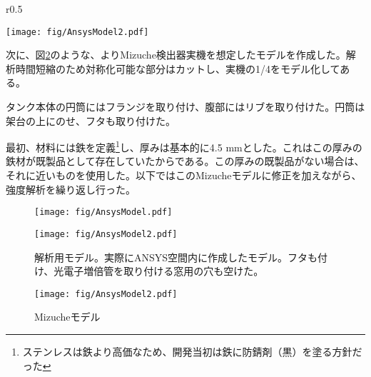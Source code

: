 \documentclass[11pt]{jreport}
\newcommand{\figref}[1]{図\ref{#1}}
\begin{document}
\begin{wrapfigure}{r}{0.5\textwidth}
\begin{center}
\texttt{[image: fig/AnsysModel2.pdf]}
\caption[``Mizuche''モデル]{``Mizuche''モデル。}
\label{AnsysModel3}
\end{center}
\end{wrapfigure}
\fi

次に、\figref{AnsysModel3}のような、よりMizuche検出器実機を想定したモデルを作成した。解析時間短縮のため対称化可能な部分はカットし、実機の1/4をモデル化してある。

タンク本体の円筒にはフランジを取り付け、腹部にはリブを取り付けた。円筒は架台の上にのせ、フタも取り付けた。

最初、材料には鉄を定義\footnote{ステンレスは鉄より高価なため、開発当初は鉄に防錆剤（黒）を塗る方針だった}し、厚みは基本的に4.5 mmとした。これはこの厚みの鉄材が既製品として存在していたからである。この厚みの既製品がない場合は、それに近いものを使用した。以下ではこのMizucheモデルに修正を加えながら、強度解析を繰り返し行った。

\begin{figure}[htbp]
\begin{minipage}{0.47\textwidth}
\begin{center}
\texttt{[image: fig/AnsysModel.pdf]}
\caption[強度解析モデルのスケッチ]{強度解析モデルのスケッチ}
\label{AnsysModel}
\end{center}
\end{minipage}
\begin{minipage}{0.47\textwidth}
\begin{center}
\texttt{[image: fig/AnsysModel2.pdf]}
\caption[強度解析モデル]{解析用モデル。実際にANSYS空間内に作成したモデル。フタも付け、光電子増倍管を取り付ける窓用の穴も空けた。}
\label{AnsysModel2}
\end{center}
\end{minipage}
\end{figure}
\fi %

\begin{figure}[htbp]
\begin{center}
\texttt{[image: fig/AnsysModel2.pdf]}
\caption[Mizucheモデル]{Mizucheモデル}
\label{AnsysModel3}
\end{center}
\end{figure}
\end{document}

